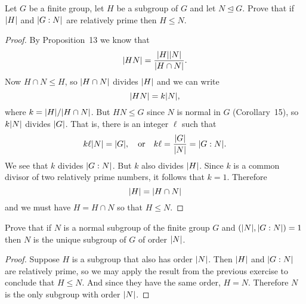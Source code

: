  Let $G$ be a finite group, let $H$ be a subgroup of $G$
and let $N\trianglelefteq G$. Prove that if $\lvert{H}\rvert$ and $\lvert{G:N}\rvert$
are relatively prime then $H\leq N$.
\begin{proof}
  By Proposition~13 we know that
  \begin{equation*}
    \lvert{HN}\rvert = \frac{\lvert{H}\rvert\lvert{N}\rvert}{\lvert{H\cap N}\rvert}.
  \end{equation*}
  Now $H\cap N\leq H$, so $\lvert{H\cap N}\rvert$ divides $\lvert{H}\rvert$ and we can
  write
  \begin{equation*}
    \lvert{HN}\rvert = k\lvert{N}\rvert,
  \end{equation*}
  where $k = \lvert{H}\rvert/\lvert{H\cap N}\rvert$. But $HN\leq G$ since $N$ is
  normal in $G$ (Corollary~15), so $k\lvert{N}\rvert$ divides $\lvert{G}\rvert$. That
  is, there is an integer $\ell$ such that
  \begin{equation*}
    k\ell\lvert{N}\rvert = \lvert{G}\rvert,
    \quad\text{or}\quad
    k\ell = \frac{\lvert{G}\rvert}{\lvert{N}\rvert} = \lvert{G:N}\rvert.
  \end{equation*}
  We see that $k$ divides $\lvert{G:N}\rvert$. But $k$ also divides
  $\lvert{H}\rvert$. Since $k$ is a common divisor of two relatively prime
  numbers, it follows that $k = 1$. Therefore
  \begin{equation*}
    \lvert{H}\rvert = \lvert{H\cap N}\rvert
  \end{equation*}
  and we must have $H = H\cap N$ so that $H\leq N$.
\end{proof}

 Prove that if $N$ is a normal subgroup of the finite
group $G$ and $(\lvert{N}\rvert,\lvert{G:N}\rvert) = 1$ then $N$ is the unique
subgroup of $G$ of order $\lvert{N}\rvert$.
\begin{proof}
  Suppose $H$ is a subgroup that also has order $\lvert{N}\rvert$. Then
  $\lvert{H}\rvert$ and $\lvert{G:N}\rvert$ are relatively prime, so we may apply the
  result from the previous exercise to conclude that $H\leq N$. And
  since they have the same order, $H = N$. Therefore $N$ is the only
  subgroup with order $\lvert{N}\rvert$.
\end{proof}
